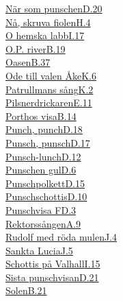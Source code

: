   \hyperref[narsompunschen]{När som punschen}\dotfill\hyperref[narsompunschen]{D.20}\\
  \hyperref[naskruvafiolen]{Nå, skruva fiolen}\dotfill\hyperref[naskruvafiolen]{H.4}\\
  \hyperref[ohemskalabb]{O hemska labb}\dotfill\hyperref[ohemskalabb]{I.17}\\
  \hyperref[opriver]{O.P. river}\dotfill\hyperref[opriver]{B.19}\\
  \hyperref[oasen]{Oasen}\dotfill\hyperref[oasen]{B.37}\\
  \hyperref[valenake]{Ode till valen Åke}\dotfill\hyperref[valenake]{K.6}\\
  \hyperref[patrullmanssang]{Patrullmans sång}\dotfill\hyperref[patrullmanssang]{K.2}\\
  \hyperref[pilsnerdrickaren]{Pilsnerdrickaren}\dotfill\hyperref[pilsnerdrickaren]{E.11}\\
  \hyperref[porthos]{Porthos visa}\dotfill\hyperref[porthos]{B.14}\\
  \hyperref[punchpunch]{Punch, punch}\dotfill\hyperref[punchpunch]{D.18}\\
  \hyperref[punschpunsch]{Punsch, punsch}\dotfill\hyperref[punschpunsch]{D.17}\\
  \hyperref[punschlunch]{Punsch-lunch}\dotfill\hyperref[punschlunch]{D.12}\\
  \hyperref[punschengul]{Punschen gul}\dotfill\hyperref[punschengul]{D.6}\\
  \hyperref[punschpolkett]{Punschpolkett}\dotfill\hyperref[punschpolkett]{D.15}\\
  \hyperref[punschschottis]{Punschschottis}\dotfill\hyperref[punschschottis]{D.10}\\
  \hyperref[punschvisaf]{Punschvisa F}\dotfill\hyperref[punschvisaf]{D.3}\\
  \hyperref[rektorssangen]{Rektorssången}\dotfill\hyperref[rektorssangen]{A.9}\\
  \hyperref[rudolfmedrodamulen]{Rudolf med röda mulen}\dotfill\hyperref[rudolfmedrodamulen]{J.4}\\
  \hyperref[sanktalucia]{Sankta Lucia}\dotfill\hyperref[sanktalucia]{J.5}\\
  \hyperref[schottispavalhall]{Schottis på Valhall}\dotfill\hyperref[schottispavalhall]{I.15}\\
  \hyperref[sistapunschvisan]{Sista punschvisan}\dotfill\hyperref[sistapunschvisan]{D.21}\\
  \hyperref[solen]{Solen}\dotfill\hyperref[solen]{B.21}\\
